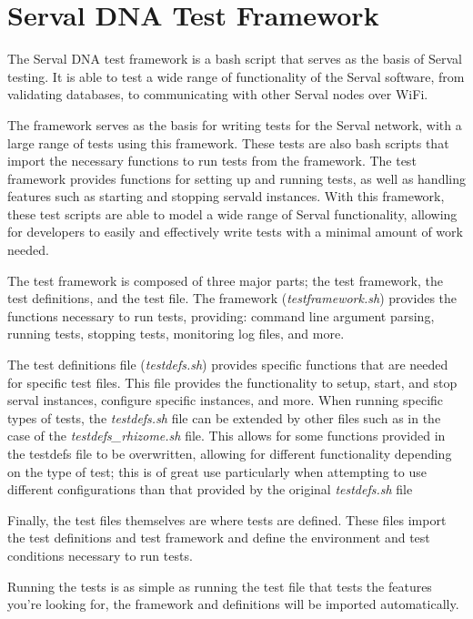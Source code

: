 \section{Serval DNA Test Framework}
The Serval DNA test framework is a bash script that serves as the basis of Serval testing.
It is able to test a wide range of functionality of the Serval software, from validating databases, to communicating with other Serval nodes over WiFi.

The framework serves as the basis for writing tests for the Serval network, with a large range of tests using this framework.
These tests are also bash scripts that import the necessary functions to run tests from the framework. 
The test framework provides functions for setting up and running tests, as well as handling features such as starting and stopping servald instances.
With this framework, these test scripts are able to model a wide range of Serval functionality, allowing for developers to easily and effectively write tests with a minimal amount of work needed.

The test framework is composed of three major parts; the test framework, the test definitions, and the test file.
The framework (\emph{testframework.sh}) provides the functions necessary to run tests, providing: command line argument parsing, running tests, stopping tests, monitoring log files, and more. 

The test definitions file (\emph{testdefs.sh}) provides specific functions that are needed for specific test files.
This file provides the functionality to setup, start, and stop serval instances, configure specific instances, and more.
When running specific types of tests, the \emph{testdefs.sh} file can be extended by other files such as in the case of the \emph{testdefs\_rhizome.sh} file. 
This allows for some functions provided in the testdefs file to be overwritten, allowing for different functionality depending on the type of test; this is of great use particularly when attempting to use different configurations than that provided by the original \emph{testdefs.sh} file

Finally, the test files themselves are where tests are defined. 
These files import the test definitions and test framework and define the environment and test conditions necessary to run tests. 

Running the tests is as simple as running the test file that tests the features you're looking for, the framework and definitions will be imported automatically.


